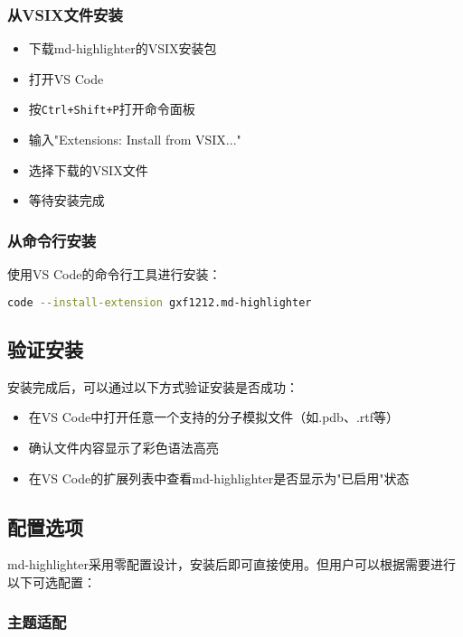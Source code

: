 \subsubsection{从VSIX文件安装}

\begin{itemize}
    \item 下载md-highlighter的VSIX安装包
    \item 打开VS Code
    \item 按\texttt{Ctrl+Shift+P}打开命令面板
    \item 输入"Extensions: Install from VSIX..."
    \item 选择下载的VSIX文件
    \item 等待安装完成
\end{itemize}

\subsubsection{从命令行安装}

使用VS Code的命令行工具进行安装：
\begin{lstlisting}[style=blockstyle,language=bash]
code --install-extension gxf1212.md-highlighter
\end{lstlisting}

\subsection{验证安装}

安装完成后，可以通过以下方式验证安装是否成功：

\begin{itemize}
    \item 在VS Code中打开任意一个支持的分子模拟文件（如.pdb、.rtf等）
    \item 确认文件内容显示了彩色语法高亮
    \item 在VS Code的扩展列表中查看md-highlighter是否显示为"已启用"状态
\end{itemize}

\subsection{配置选项}

md-highlighter采用零配置设计，安装后即可直接使用。但用户可以根据需要进行以下可选配置：

\subsubsection{主题适配}

